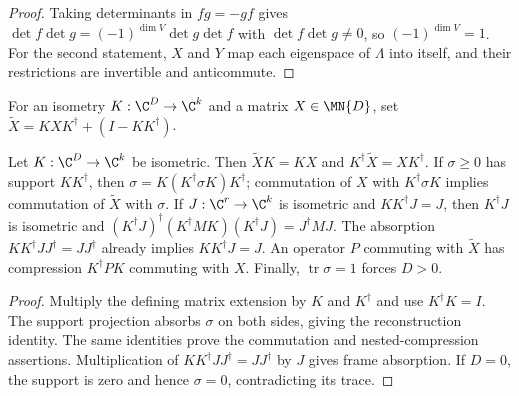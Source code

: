 \begin{proof}\leanok
    Taking determinants in $fg=-gf$ gives
    $\det f\det g=(-1)^{\dim V}\det g\det f$ with $\det f\det g\neq0$, so
    $(-1)^{\dim V}=1$. For the second statement, $X$ and $Y$ map each eigenspace
    of $\Lambda$ into itself, and their restrictions are invertible and
    anticommute.
\end{proof}

\begin{definition}
    \label{def:spt_supported_matrix_extension}
    \leanok
    For an isometry $K:\C^D\to\C^k$ and a matrix $X\in\MN{D}$, set
    $\widetilde X=KXK^\dagger+(I-KK^\dagger)$.
\end{definition}

\begin{lemma}
    \label{thm:spt_supported_frame_comparison}
    \leanok
    Let $K:\C^D\to\C^k$ be isometric. Then
    $\widetilde X K=KX$ and $K^\dagger\widetilde X=XK^\dagger$.
    If $\sigma\geq0$ has support $KK^\dagger$, then
    $\sigma=K(K^\dagger\sigma K)K^\dagger$; commutation of $X$ with
    $K^\dagger\sigma K$ implies commutation of $\widetilde X$ with $\sigma$.
    If $J:\C^r\to\C^k$ is isometric and $KK^\dagger J=J$, then
    $K^\dagger J$ is isometric and
    $(K^\dagger J)^\dagger(K^\dagger M K)(K^\dagger J)=J^\dagger M J$.
    The absorption $KK^\dagger JJ^\dagger=JJ^\dagger$ already implies
    $KK^\dagger J=J$.
    An operator $P$ commuting with $\widetilde X$ has compression
    $K^\dagger P K$ commuting with $X$.
    Finally, $\operatorname{tr}\sigma=1$ forces $D>0$.
\end{lemma}

\begin{proof}\leanok
    Multiply the defining matrix extension by $K$ and $K^\dagger$ and
    use $K^\dagger K=I$. The support projection absorbs $\sigma$ on
    both sides, giving the reconstruction identity. The same identities
    prove the commutation and nested-compression assertions.
    Multiplication of $KK^\dagger JJ^\dagger=JJ^\dagger$ by $J$ gives
    frame absorption. If $D=0$, the support is zero and hence
    $\sigma=0$, contradicting its trace.
\end{proof}

